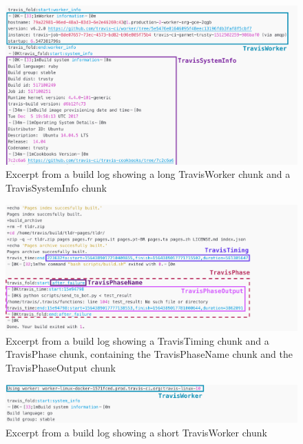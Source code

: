 \documentclass[\myrootdir/main.tex]{subfiles}
\begin{document}
\begin{figure}[htbp]
	\centering
	\includegraphics[width=\textwidth, clip]{img/log02.png}
	\caption{Excerpt from a build log showing a long TravisWorker chunk and a TravisSystemInfo chunk}
	\label{fig:log-0}
\end{figure}
\begin{figure}[htbp]
	\centering
	\includegraphics[width=\textwidth, clip]{img/log12.png}
	\caption{Excerpt from a build log showing a TravisTiming chunk and a TravisPhase chunk, containing the TravisPhaseName chunk and the TravisPhaseOutput chunk}
	\label{fig:log-1}
\end{figure}
\begin{figure}[htbp]
	\centering
	\includegraphics[width=\textwidth, clip]{img/log22.png}
	\caption{Excerpt from a build log showing a short TravisWorker chunk}
	\label{fig:log-2}
\end{figure}
\end{document}
